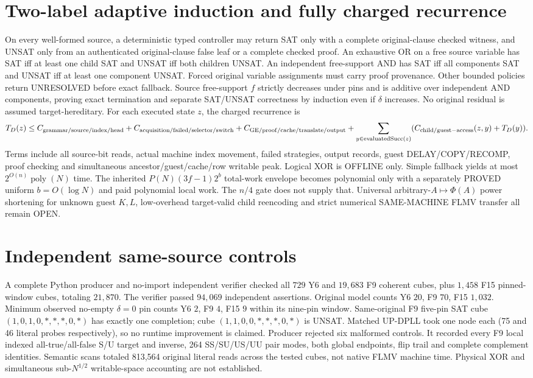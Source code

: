 \documentclass[11pt]{article}
\begin{document}
\section{Two-label adaptive induction and fully charged recurrence}
On every well-formed source, a deterministic typed controller may return SAT only with a complete original-clause checked witness, and UNSAT only from an authenticated original-clause false leaf or a complete checked proof. An exhaustive OR on a free source variable has SAT iff at least one child SAT and UNSAT iff both children UNSAT. An independent free-support AND has SAT iff all components SAT and UNSAT iff at least one component UNSAT. Forced original variable assignments must carry proof provenance. Other bounded policies return UNRESOLVED before exact fallback. Source free-support $f$ strictly decreases under pins and is additive over independent AND components, proving exact termination and separate SAT/UNSAT correctness by induction even if $\delta$ increases. No original residual is assumed target-hereditary.
For each executed state $z$, the charged recurrence is
\[
T_D(z)\le C_{\rm grammar/source/index/head}
+C_{\rm acquisition/failed/selector/switch}
+C_{\rm GE/proof/cache/translate/output}
+\sum_{y\in{\rm evaluatedSucc}(z)}
(C_{\rm child/guest-access}(z,y)+T_D(y)).
\]
Terms include all source-bit reads, actual machine index movement, failed strategies, output records, guest DELAY/COPY/RECOMP, proof checking and simultaneous ancestor/guest/cache/row writable peak. Logical XOR is OFFLINE only. Simple fallback yields at most $2^{O(n)}\operatorname{poly}(N)$ time. The inherited $P(N)(3f-1)2^b$ total-work envelope becomes polynomial only with a separately PROVED uniform $b=O(\log N)$ and paid polynomial local work. The $n/4$ gate does not supply that. Universal arbitrary-$A\mapsto\Phi(A)$ power shortening for unknown guest $K,L$, low-overhead target-valid child reencoding and strict numerical SAME-MACHINE FLMV transfer all remain OPEN.
\section{Independent same-source controls}
A complete Python producer and no-import independent verifier checked all $729$ Y6 and $19{,}683$ F9 coherent cubes, plus $1{,}458$ F15 pinned-window cubes, totaling $21{,}870$. The verifier passed $94{,}069$ independent assertions. Original model counts Y6 $20$, F9 $70$, F15 $1{,}032$. Minimum observed no-empty $\delta=0$ pin counts Y6 $2$, F9 $4$, F15 $9$ within its nine-pin window. Same-original F9 five-pin SAT cube $(1,0,1,0,*,*,*,0,*)$ has exactly one completion; cube $(1,1,0,0,*,*,*,0,*)$ is UNSAT. Matched UP-DPLL took one node each (75 and 46 literal probes respectively), so no runtime improvement is claimed. Producer rejected six malformed controls. It recorded every F9 local indexed all-true/all-false S/U target and inverse, 264 SS/SU/US/UU pair modes, both global endpoints, flip trail and complete complement identities. Semantic scans totaled 813,564 original literal reads across the tested cubes, not native FLMV machine time. Physical XOR and simultaneous sub-$N^{1/2}$ writable-space accounting are not established.
\end{document}
